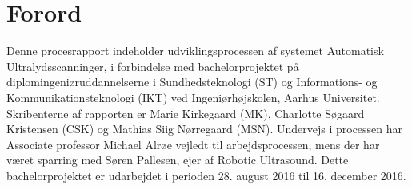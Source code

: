 \chapter{Forord}\label{kapForord}
Denne procesrapport indeholder udviklingsprocessen af systemet Automatisk Ultralydsscanninger, i forbindelse med bachelorprojektet på diplomingeniøruddannelserne i Sundhedsteknologi (ST) og Informations- og Kommunikationsteknologi (IKT) ved Ingeniørhøjskolen, Aarhus Universitet. Skribenterne af rapporten er Marie Kirkegaard (MK), Charlotte Søgaard Kristensen (CSK) og Mathias Siig Nørregaard (MSN). Undervejs i processen har Associate professor Michael Alrøe vejledt til arbejdsprocessen, mens der har været sparring med Søren Pallesen, ejer af Robotic Ultrasound. Dette bachelorprojektet er udarbejdet i perioden 28. august 2016 til 16. december 2016.
